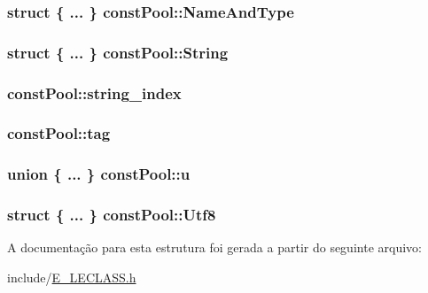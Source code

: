 \subsubsection[{Name\+And\+Type}]{\setlength{\rightskip}{0pt plus 5cm}struct \{ ... \}   const\+Pool\+::\+Name\+And\+Type}\label{structconst_pool_a727268ed0e1405a5eaab1aa5ad3cba74}
\hypertarget{structconst_pool_ab014bc483e8b8803ecf0c288495b5a5e}{}
\subsubsection[{String}]{\setlength{\rightskip}{0pt plus 5cm}struct \{ ... \}   const\+Pool\+::\+String}\label{structconst_pool_ab014bc483e8b8803ecf0c288495b5a5e}
\hypertarget{structconst_pool_a1bb9e94f3cb54a3e19bde3d251379ac0}{}
\subsubsection[{string\+\_\+index}]{ const\+Pool\+::string\+\_\+index}\label{structconst_pool_a1bb9e94f3cb54a3e19bde3d251379ac0}
\hypertarget{structconst_pool_a876197bb013e214c071ab56d1de8ed25}{}
\subsubsection[{tag}]{ const\+Pool\+::tag}\label{structconst_pool_a876197bb013e214c071ab56d1de8ed25}
\hypertarget{structconst_pool_ab327fbd2fec182d523b180c4d941d7f5}{}
\subsubsection[{u}]{\setlength{\rightskip}{0pt plus 5cm}union \{ ... \}   const\+Pool\+::u}\label{structconst_pool_ab327fbd2fec182d523b180c4d941d7f5}
\hypertarget{structconst_pool_ab18ebde1a84b99d3dc0b70b1df46be82}{}
\subsubsection[{Utf8}]{\setlength{\rightskip}{0pt plus 5cm}struct \{ ... \}   const\+Pool\+::\+Utf8}\label{structconst_pool_ab18ebde1a84b99d3dc0b70b1df46be82}


A documentação para esta estrutura foi gerada a partir do seguinte arquivo\+:\begin{DoxyCompactItemize}
\item 
include/\hyperlink{_e___l_e_c_l_a_s_s_8h}{E\+\_\+\+L\+E\+C\+L\+A\+S\+S.\+h}\end{DoxyCompactItemize}
